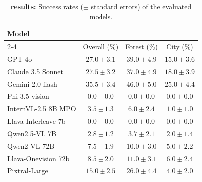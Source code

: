 \begin{table}[th]
    \centering
    \begin{footnotesize}
    \caption{\textbf{\anomalychallenge{} results:} Success rates ($\pm$ standard errors) of the evaluated models.}
\label{tab:main_results_anomaly_app}
    \begin{tabular}{lccc}
\toprule
\multirow{2}{*}{Model}& \multicolumn{3}{c}{\anomalychallenge{}} \\
\cmidrule(lr){2-4}
 & Overall (\%) & Forest (\%) & City (\%)\\
\midrule
GPT-4o & $ 27.0 \pm 3.1 $ & $ 39.0 \pm 4.9 $ & $ 15.0 \pm 3.6 $ \\
Claude 3.5 Sonnet & $ 27.5 \pm 3.2 $ & $ 37.0 \pm 4.9 $ & $ 18.0 \pm 3.9 $ \\
Gemini 2.0 flash & $ \mathbf{35.5 \pm 3.4} $ & $ \mathbf{46.0 \pm 5.0} $ & $ \mathbf{25.0 \pm 4.4} $ \\
\midrule
Phi 3.5 vision & $ 0.0 \pm 0.0 $ & $ 0.0 \pm 0.0 $ & $ 0.0 \pm 0.0 $ \\
InternVL-2.5 8B MPO & $ 3.5 \pm 1.3 $ & $ 6.0 \pm 2.4 $ & $ 1.0 \pm 1.0 $ \\
Llava-Interleave-7b & $ 0.0 \pm 0.0 $ & $ 0.0 \pm 0.0 $ & $ 0.0 \pm 0.0 $ \\
Qwen2.5-VL 7B & $ 2.8 \pm 1.2 $ & $ 3.7 \pm 2.1 $ & $ 2.0 \pm 1.4 $ \\
\midrule
Qwen2-VL-72B & $ 7.5 \pm 1.9 $ & $ 10.0 \pm 3.0 $ & $ 5.0 \pm 2.2 $ \\
Llava-Onevision 72b & $ 8.5 \pm 2.0 $ & $ 11.0 \pm 3.1 $ & $ 6.0 \pm 2.4 $ \\
Pixtral-Large & $ 15.0 \pm 2.5 $ & $ 26.0 \pm 4.4 $ & $ 4.0 \pm 2.0 $ \\
\bottomrule
\end{tabular}
\end{footnotesize}
\end{table}